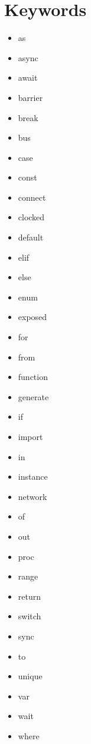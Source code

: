 \documentclass{article}
\begin{document}
\section*{Keywords}
\begin{multicols}{3}
  \begin{itemize}
  \item as
  \item async
  \item await
  \item barrier
  \item break
  \item bus
  \item case
  \item const
  \item connect
  \item clocked
  \item default
  \item elif
  \item else
  \item enum
  \item exposed
  \item for
  \item from
  \item function
  \item generate
  \item if
  \item import
  \item in
  \item instance
  \item network
  \item of
  \item out
  \item proc
  \item range
  \item return
  \item switch
  \item sync
  \item to
  \item unique
  \item var
  \item wait
  \item where
  \end{itemize}
\end{multicols}
\end{document}
